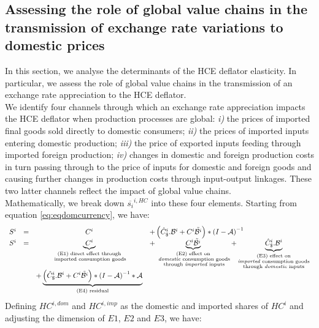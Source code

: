 \documentclass[11pt,a4paper]{paper} %
\begin{document}
\subsection{Assessing the role of global value chains in the transmission of exchange rate variations to domestic prices}
In this section, we analyse the determinants of the HCE deflator elasticity. 
In particular, we assess the role of global value chains in the transmission of an exchange rate appreciation to the HCE deflator.\\ 
We identify four channels through which an exchange rate appreciation impacts the HCE deflator when production processes are global: \textit{i)} the prices of imported ﬁnal goods sold directly to domestic consumers;
\textit{ii)} the prices of imported inputs entering domestic production; 
\textit{iii)} the price of exported inputs feeding through imported foreign production;
\textit{iv)} changes in domestic and foreign production costs in turn passing through to the price of inputs for domestic and foreign goods and causing further changes in production costs through input-output linkages.
These two latter channels reflect the impact of global value chains.\\
Mathematically, we break down $\overline{s_{i}}^{i,HC}$ into these four elements.
Starting from equation \ref{eq:eqdomcurrency}, we have:
\begin{equation}
\begin{array}{lccl}
	S^ i&=&C^i	&+ \left(\hat{C}^i_\$.{\cal B}^i+{C^i}{\tilde{{\cal B}^i}}\right)*{{(I-{\cal A})}^{-1}} \\
	S^i &=&\underbrace{C^i}_{\substack{\text{(E1) direct effect through} \\ \text{ imported consumption goods}}}&+ \underbrace{{C^i}{\tilde{{\cal B}^i}}}_{\substack{\text{(E2) effect on} \\ \text{ \emph{domestic} consumption goods} \\ \text{ through \emph{imported} inputs}}}  + \underbrace{\hat{C}^i_\$.{\cal B}^i}_{\substack{\text{(E3)  effect on} \\ \text{\emph{imported} consumption goods} \\ \text{through \emph{domestic} inputs}}} \\ &&+\underbrace {\left( \hat{C}^i_\$.{\cal B}^i + {C^i}{\tilde{{\cal B}^i}}\right)*{{(I-{\cal A})}^{-1}}*{\cal A}}_{\text{(E4) residual}} \\
\end{array}
\label{eq:decomp}
\end{equation}
Defining $HC^{i,dom}$ and $HC^{i,imp}$ as the domestic and imported shares of $HC^i$ and adjusting the dimension of $E1$, $E2$ and $E3$, we have:
\end{document}
